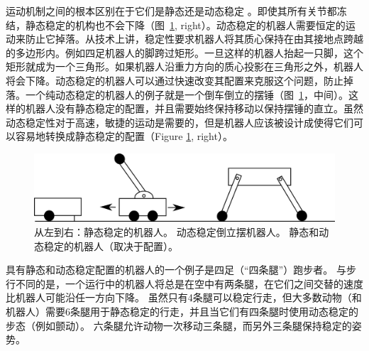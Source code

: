 运动机制之间的根本区别在于它们是静态还是动态稳定 。即使其所有关节都冻结，静态稳定的机构也不会下降（图~\ref{fig:stability}, right）。动态稳定的机器人需要恒定的运动来防止它掉落。从技术上讲，稳定性要求机器人将其质心保持在由其接地点跨越的多边形内。例如四足机器人的脚跨过矩形。一旦这样的机器人抬起一只脚，这个矩形就成为一个三角形。如果机器人沿重力方向的质心投影在三角形之外，机器人将会下降。动态稳定的机器人可以通过快速改变其配置来克服这个问题，防止掉落。一个纯动态稳定的机器人的例子就是一个倒车倒立的摆锤（图~\ref{fig:stability}，中间）。这样的机器人没有静态稳定的配置，并且需要始终保持移动以保持摆锤的直立。虽然动态稳定性对于高速，敏捷的运动是需要的，但是机器人应该被设计成使得它们可以容易地转换成静态稳定的配置（Figure \ref{fig:stability}, right）。

\begin{figure}
	\centering
		\includegraphics[width=\textwidth]{figs/stability.png}
	\caption{从左到右：静态稳定的机器人。 动态稳定倒立摆机器人。 静态和动态稳定的机器人（取决于配置）。}
	\label{fig:stability}
\end{figure}


具有静态和动态稳定配置的机器人的一个例子是四足（“四条腿”）跑步者。 与步行不同的是，一个运行中的机器人将总是在空中有两条腿，在它们之间交替的速度比机器人可能沿任一方向下降。 虽然只有4条腿可以稳定行走，但大多数动物（和机器人）需要6条腿用于静态稳定的行走，并且当它们有四条腿时使用动态稳定的步态（例如颤动）。 六条腿允许动物一次移动三条腿，而另外三条腿保持稳定的姿势。

